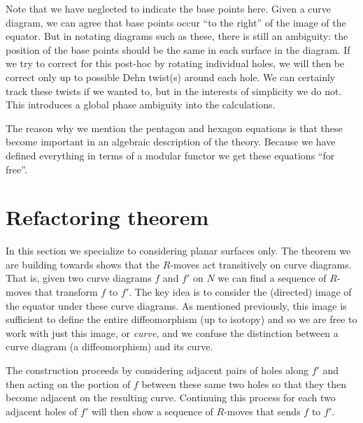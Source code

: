 \documentclass[aps, prl, letterpaper, twocolumn, superscriptaddress, notitlepage, 10pt]{revtex4-1}
\begin{document}
Note that we have neglected to indicate the base points here.
Given a curve diagram, we can agree that base points
occur ``to the right'' of the image of the equator.
But in notating diagrams such as these, there is still
an ambiguity: the position of the base points should be the
same in each surface in the diagram.
If we try to correct for this post-hoc
by rotating individual holes,
we will then be correct
only up to possible Dehn twist(s) around each hole.
We can certainly track these twists if we wanted to,
but in the interests of simplicity we do not.
This introduces a global phase ambiguity into the
calculations.

The reason why we mention the pentagon and hexagon
equations is that these become important in an
algebraic description of the theory.
Because we have defined everything in terms of
a modular functor we get these equations ``for free''.

%
%

\section{Refactoring theorem}
In this section we specialize to considering planar surfaces only.
The theorem we are building towards shows that
the $R$-moves act transitively on curve diagrams.
That is, given two curve diagrams $f$ and $f'$ on $N$ we can find
a sequence of $R$-moves that transform $f$ to $f'.$
The key idea is to consider the (directed) image of the equator under
these curve diagrams.
As mentioned previously, this image is sufficient to
define the entire diffeomorphism (up to isotopy) and so we are free
to work with just this image, or \emph{curve},
and we confuse the distinction between 
a curve diagram (a diffeomorphism)
and its curve.

The construction proceeds by considering adjacent
pairs of holes along $f'$ and then acting on the
portion of $f$ between these same two holes so that
they then become adjacent on the resulting curve.
Continuing this
process for each two adjacent holes of $f'$ will then
show a sequence of $R$-moves that sends $f$ to $f'.$
\end{document}
